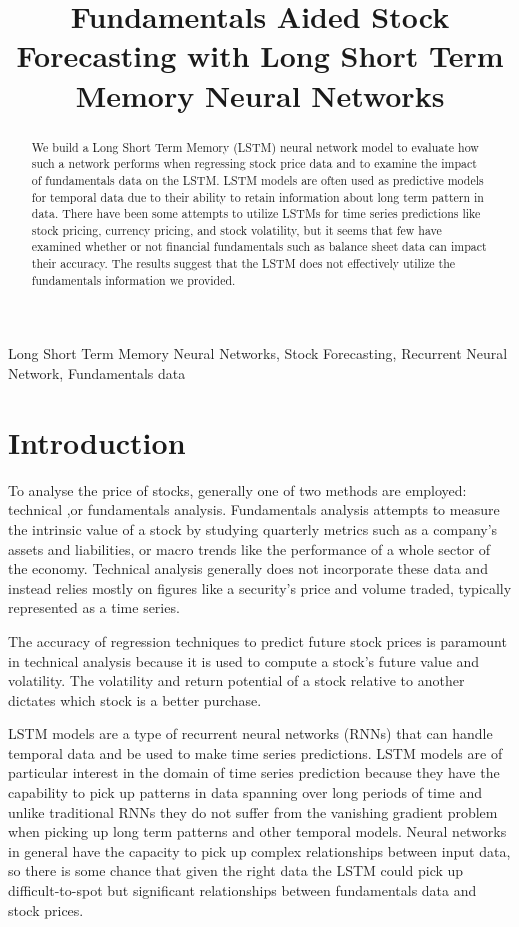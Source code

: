 \documentclass{article}
\title{Fundamentals Aided Stock Forecasting with Long Short Term Memory Neural Networks}
\begin{document}
%
\maketitle
%
\begin{abstract}
We build a Long Short Term Memory (LSTM) neural network model to evaluate how such a network performs when regressing stock price data and to examine the impact of fundamentals data on the LSTM. LSTM models are often used as predictive models for temporal data due to their ability to retain information about long term pattern in data. There have been some attempts to utilize LSTMs for time series predictions like stock pricing, currency pricing, and stock volatility\cite{maknickienė_rutkauskas_maknickas_2011}, but it seems that few have examined whether or not financial fundamentals such as balance sheet data can impact their accuracy. The results suggest that the LSTM does not effectively utilize the fundamentals information we provided.
\end{abstract}
%
\begin{keywords}
Long Short Term Memory Neural Networks, Stock Forecasting, Recurrent Neural Network, Fundamentals data
\end{keywords}
%
\section{Introduction}
\label{sec:intro}

To analyse the price of stocks, generally one of two methods are employed: technical ,or fundamentals analysis. Fundamentals analysis attempts to measure the intrinsic value of a stock by studying quarterly metrics such as a company's assets and liabilities, or macro trends like the performance of a whole sector of the economy. Technical analysis generally does not incorporate these data and instead relies mostly on figures like a security's price and volume traded, typically represented as a time series. 

The accuracy of regression techniques to predict future stock prices is paramount in technical analysis because it is used to compute a stock's future value and volatility. The volatility and return potential of a stock relative to another dictates which stock is a better purchase.

LSTM models are a type of recurrent neural networks (RNNs) that can handle temporal data and be used to make time series predictions. LSTM models are of particular interest in the domain of time series prediction because they have the capability to pick up patterns in data spanning over long periods of time and unlike traditional RNNs they do not suffer from the vanishing gradient problem when picking up long term patterns and other temporal models. Neural networks in general have the capacity to pick up complex relationships between input data, so there is some chance that given the right data the LSTM could pick up difficult-to-spot but significant relationships between fundamentals data and stock prices.
\end{document}
